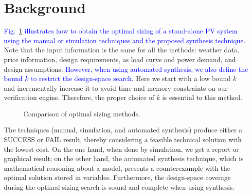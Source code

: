 \documentclass[runningheads]{llncs}
\begin{document}
\vspace{-2ex}

\section{Background}
\label{sec:AutomatedVerification}
\vspace{-1ex}

\textcolor{blue}{Fig.~\ref{fig:optimization} illustrates how to obtain the optimal sizing of a stand-alone PV system using the manual or simulation techniques and the proposed synthesis technique}. Note that the input information is the same for all the methods: weather data, price information, design requirements, as load curve and power demand, and design assumptions. \textcolor{blue}{However, when using automated synthesis, we also define the bound $k$ to restrict the design-space search}. Here we start with a low bound $k$ and incrementally increase it to avoid time and memory constraints on our verification engine. Therefore, the proper choice of $k$ is essential to this method.
%
\begin{figure}[h]
\centering
\caption{Comparison of optimal sizing methods.}
\label{fig:optimization}
\end{figure}

The techniques (manual, simulation, and automated synthesis) produce either a SUCCESS or FAIL result, thereby considering a feasible technical solution with the lowest cost. On the one hand, when done by simulation, we get a report or graphical result; on the other hand, the automated synthesis technique, which is mathematical reasoning about a model, presents a counterexample with the optimal solution stored in variables. Furthermore, the design-space coverage during the optimal sizing search is sound and complete when using synthesis.
\end{document}
